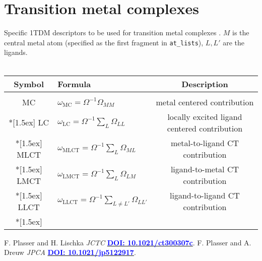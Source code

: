 \documentclass[12pt,a4paper]{article}
\newcommand{\om}[1]{\omega_{\textrm{#1}}}
\newcommand{\doi}[1]{\href{http://dx.doi.org/#1}{\textcolor{blue}{\bf DOI: #1}}}
\begin{document}
\section{Transition metal complexes}
Specific 1TDM descriptors to be used for transition metal complexes \cite{Ircomp}.
$M$ is the central metal atom (specified as the first fragment in \texttt{at\_lists}), $L,L'$ are the ligands.
\\~\\
\begin{tabular}{clc}
\hline 
\textbf{Symbol} & \textbf{Formula} & \textbf{Description} \\ 
\hline
\\
MC & $\om{MC}=\Omega^{-1}\Omega_{MM}$ & metal centered contribution \\*[1.5ex]
LC & $\om{LC}=\Omega^{-1}\sum_L\Omega_{LL}$ & locally excited ligand centered contribution \\*[1.5ex]
MLCT & $\om{MLCT}=\Omega^{-1}\sum_L\Omega_{ML}$ & metal-to-ligand CT contribution \\*[1.5ex]
LMCT & $\om{LMCT}=\Omega^{-1}\sum_L\Omega_{LM}$ & ligand-to-metal CT contribution\\*[1.5ex]
LLCT & $\om{LLCT}=\Omega^{-1}\sum_{L\neq L'}\Omega_{LL'}$ & ligand-to-ligand CT contribution\\*[1.5ex]
\hline 
\end{tabular} 


\begin{thebibliography}{9}
 F. Plasser and H. Lischka \textit{JCTC} \doi{10.1021/ct300307c}.
 F. Plasser and A. Dreuw \textit{JPCA} \doi{10.1021/jp5122917}.
\end{thebibliography}
\end{document}
